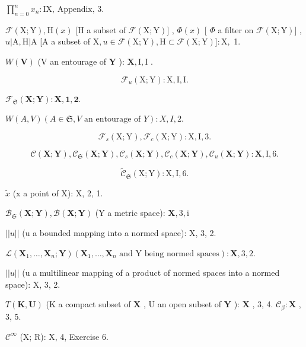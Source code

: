\(\prod_{n=0}^{n} x_n: \text{IX, Appendix, 3.}\)

\(\mathcal{F}(\mathrm{X};\mathrm{Y}),\mathrm{H}(x)\) {[}H a subset of \(\mathcal{F}(\mathrm{X};\mathrm{Y})]\) , \(\Phi (x)\) {[} \(\Phi\) a filter on \(\mathcal{F}(\mathrm{X};\mathrm{Y})]\) , \(u|\mathrm{A},\mathrm{H}|\mathrm{A}\) {[}A a subset of \(\mathrm{X},u\in \mathcal{F}(\mathrm{X};\mathrm{Y}),\mathrm{H}\subset \mathcal{F}(\mathrm{X};\mathrm{Y})]:\mathrm{X},\) 1.

\(W(\mathbf{V})\) (V an entourage of \(\mathbf{Y}\) ): \(\mathbf{X}, \mathrm{I}, \mathrm{I}\) .

\[
\mathcal {F} _ {u} (\mathrm{X}; \mathrm{Y}): \mathrm{X}, \mathrm{I}, \mathrm{I}.
\]

\(\mathcal{F}_{\mathfrak{S}}(\mathbf{X};\mathbf{Y}):\mathbf{X},\mathbf{1},\mathbf{2}.\)

\(W(A, V) (A \in \mathfrak{S}, V \text{ an entourage of } Y): X, I, 2.\)

\[
\mathcal {F} _ {s} (\mathrm{X}; \mathrm{Y}), \mathcal {F} _ {c} (\mathrm{X}; \mathrm{Y}): \mathrm{X}, \mathrm{I}, 3.
\]

\[
\mathcal {C} (\mathbf {X}; \mathbf {Y}), \mathcal {C} _ {\mathfrak {S}} (\mathbf {X}; \mathbf {Y}), \mathcal {C} _ {s} (\mathbf {X}; \mathbf {Y}), \mathcal {C} _ {c} (\mathbf {X}; \mathbf {Y}), \mathcal {C} _ {u} (\mathbf {X}; \mathbf {Y}): \mathbf {X}, \mathrm{I}, 6.
\]

\[
\tilde {\mathcal {C}} _ {\mathfrak {S}} (\mathrm{X}; \mathrm{Y}): \mathrm{X}, \mathrm{I}, 6.
\]

\(\tilde{x}\) (x a point of X): X, 2, 1.

\(\mathcal{B}_{\mathfrak{S}}(\mathbf{X};\mathbf{Y}),\mathcal{B}(\mathbf{X};\mathbf{Y})\) (Y a metric space): \(\mathbf{X},3,\mathrm{i}\)

\(||u||\) (u a bounded mapping into a normed space): X, 3, 2.

\(\mathscr{L}\left(\mathbf{X}_{1},\ldots,\mathbf{X}_{n};\mathbf{Y}\right)\left(\mathbf{X}_{1},\ldots,\mathbf{X}_{n}\text{ and Y being normed spaces}\right):\mathbf{X},3,2.\)

\(||u||\) (u a multilinear mapping of a product of normed spaces into a normed space): X, 3, 2.

\(T(\mathbf{K},\mathbf{U})\) (K a compact subset of \(\mathbf{X}\) , U an open subset of \(\mathbf{Y}\) ): \(\mathbf{X}\) , 3, 4. \(\mathcal{C}_{\beta}:\mathbf{X}\) , 3, 5.

\(\mathcal{C}^{\infty}\) (X; R): X, 4, Exercise 6.

